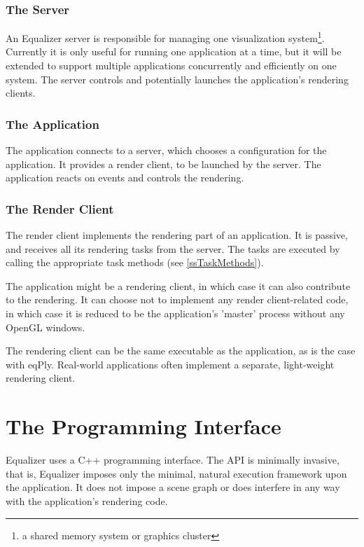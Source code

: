 \documentclass[10pt,a4]{scrartcl}
\begin{document}
\subsubsection{The Server}

An Equalizer server is responsible for managing one visualization
system\footnote{a shared memory system or graphics cluster}. Currently
it is only useful for running one application at a time, but it will be
extended to support multiple applications concurrently and efficiently
on one system. The server controls and potentially launches the
application's rendering clients.

\subsubsection{The Application}

The application connects to a server, which chooses a configuration for
the application. It provides a render client, to be launched by the
server. The application reacts on events and controls the rendering.

\subsubsection{The Render Client}

The render client implements the rendering part of an application. It is
passive, and receives all its rendering tasks from the server. The tasks
are executed by calling the appropriate task methods (see
\ref{ssTaskMethods}).

The application might be a rendering client, in which case it can also
contribute to the rendering. It can choose not to implement any render
client-related code, in which case it is reduced to be the application's
'master' process without any OpenGL windows.

The rendering client can be the same executable as the application, as
is the case with \textsf{eqPly}. Real-world applications often implement
a separate, light-weight rendering client.



\section{The Programming Interface}

Equalizer uses a C++ programming interface. The API is minimally
invasive, that is, Equalizer imposes only the minimal, natural execution
framework upon the application. It does not impose a scene graph or does
interfere in any way with the application's rendering code.
\end{document}
